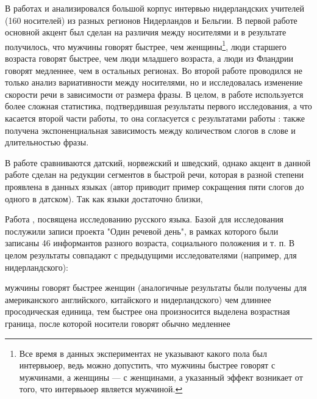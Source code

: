 \par В работах \citep{verhoeven04} и \citep{quene08} анализировался большой корпус интервью нидерландских учителей (160 носителей) из разных регионов Нидерландов и Бельгии. В первой работе основной акцент был сделан на различия между носителями и в результате получилось, что мужчины говорят быстрее, чем женщины\footnote{Все время в данных экспериментах не указывают какого пола был интервьюер, ведь можно допустить, что мужчины быстрее говорят  с мужчинами, а женщины --- с женщинами, а указанный эффект возникает от того, что интервьюер является мужчиной.}, люди старшего возраста говорят быстрее, чем люди младшего возраста, а люди из Фландрии говорят медленнее, чем в остальных регионах. Во второй работе проводился не только анализ вариативности между носителями, но и исследовалась изменение скорости речи в зависимости от размера фразы. В целом, в работе \citep{verhoeven04} используется более сложная статистика, подтвердившая результаты первого исследования, а что касается второй части работы, то она согласуется с результатами  работы \citep{fonagy60}: также получена экспоненциальная зависимость между количеством слогов в слове и длительностью фразы.
\par В работе \citep{hilton11} сравниваются датский, норвежский и шведский, однако акцент в данной работе сделан на редукции сегментов в быстрой речи, которая в разной степени проявлена в данных языках (автор приводит пример сокращения пяти слогов до одного в датском). Так как языки достаточно близки, 
\par Работа \citep{stepanova11}, посвящена исследованию русского языка. Базой для исследования послужили записи проекта "Один речевой день", в рамках которого были записаны 46 информантов разного возраста, социального положения и т. п. В целом результаты совпадают с предыдущими исследователями (например, \citep{verhoeven04} для нидерландского):
\begin{itemize}
\mytem мужчины говорят быстрее женщин (аналогичные результаты были получены для американского английского, китайского и нидерландского)
\mytem чем длиннее просодическая единица, тем быстрее она произносится
\mytem выделена возрастная граница, после которой носители говорят обычно медленнее
\end{itemize}
\par \citep{kendall13}
\pagebreak
